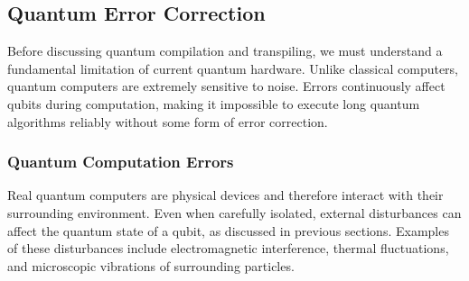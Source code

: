 \subsection{Quantum Error Correction}\label{sec:quantum-error-correction}

Before discussing quantum compilation and transpiling, we must understand a fundamental limitation of current quantum hardware. Unlike classical computers, quantum computers are extremely sensitive to noise. Errors continuously affect qubits during computation, making it impossible to execute long quantum algorithms reliably without some form of error correction.

\subsubsection{Quantum Computation Errors}\label{sec:quantum-computation-errors}

Real quantum computers are physical devices and therefore interact with their surrounding environment. Even when carefully isolated, external disturbances can affect the quantum state of a qubit, as discussed in previous sections. Examples of these disturbances include electromagnetic interference, thermal fluctuations, and microscopic vibrations of surrounding particles.

